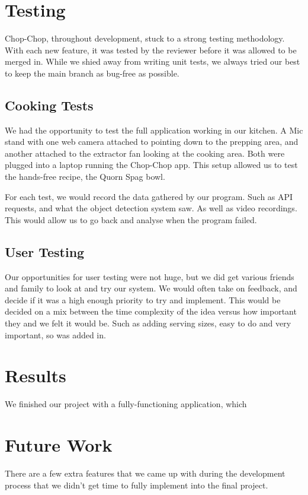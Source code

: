 \documentclass{article}
\begin{document}
\section{Testing}
Chop-Chop, throughout development, stuck to a strong testing methodology. With each new feature, it was tested by the reviewer before it was allowed to be merged in. While we shied away from writing unit tests, we always tried our best to keep the main branch as bug-free as possible. 

\subsection{Cooking Tests}
We had the opportunity to test the full application working in our kitchen. A Mic stand with one web camera attached to pointing down to the prepping area, and another attached to the extractor fan looking at the cooking area. Both were plugged into a laptop running the Chop-Chop app. This setup allowed us to test the hands-free recipe, the Quorn Spag bowl.

For each test, we would record the data gathered by our program. Such as API requests, and what the object detection system saw. As well as video recordings. This would allow us to go back and analyse when the program failed. 

\subsection{User Testing}
Our opportunities for user testing were not huge, but we did get various friends and family to look at and try our system. We would often take on feedback, and decide if it was a high enough priority to try and implement. This would be decided on a mix between the time complexity of the idea versus how important they and we felt it would be. Such as adding serving sizes, easy to do and very important, so was added in.

\section{Results}
We finished our project with a fully-functioning application, which

\section{Future Work}
There are a few extra features that we came up with during the development process that we didn’t get time to fully implement into the final project.
\end{document}
